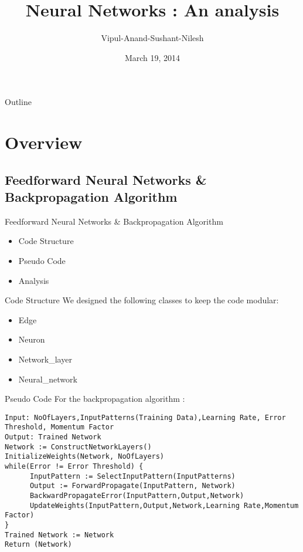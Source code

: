 \documentclass{beamer}
\title[Neural Networks]{Neural Networks : An analysis}
\author{Vipul-Anand-Sushant-Nilesh}
\institute{Indian Institute of Technology, Bombay}
\date{March 19, 2014}
\begin{document}
\begin{frame}
  \titlepage
\end{frame}

\begin{frame}{Outline}
  \tableofcontents
\end{frame}


\section{Overview}


\subsection{Feedforward Neural Networks \& Backpropagation Algorithm}
\begin{frame}{Feedforward Neural Networks \& Backpropagation Algorithm}
\begin{itemize}
  \item Code Structure
  \item Pseudo Code 
  \item Analysis
\end{itemize}
\end{frame}

\begin{frame}{Code Structure}
We designed the following classes to keep the code modular:
\begin{itemize}
	\item Edge
    \item Neuron
    \item Network\_layer
    \item Neural\_network
\end{itemize}
\end{frame}

\begin{frame}[fragile]{Pseudo Code}
For the backpropagation algorithm :
\begin{verbatim}
Input: NoOfLayers,InputPatterns(Training Data),Learning Rate, Error Threshold, Momentum Factor 
Output: Trained Network 
Network := ConstructNetworkLayers()
InitializeWeights(Network, NoOfLayers)
while(Error != Error Threshold) {
      InputPattern := SelectInputPattern(InputPatterns)
      Output := ForwardPropagate(InputPattern, Network)
      BackwardPropagateError(InputPattern,Output,Network)
      UpdateWeights(InputPattern,Output,Network,Learning Rate,Momentum Factor)
}
Trained Network := Network
Return (Network)
\end{verbatim}

\end{frame}
\end{document}
